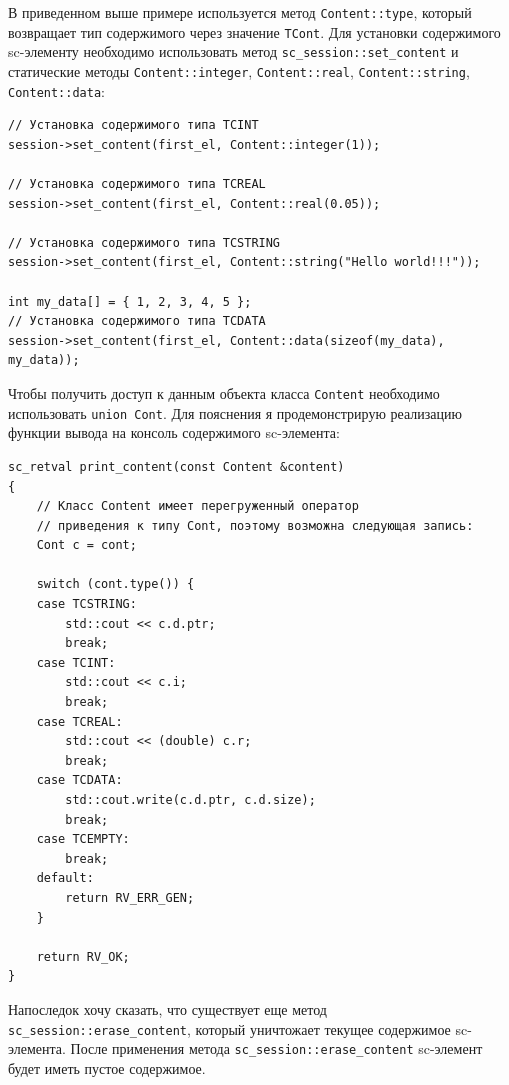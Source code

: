В приведенном выше примере используется метод
\lstinline|Content::type|, который возвращает тип содержимого через
значение \lstinline|TCont|. Для установки содержимого sc-элементу
необходимо использовать метод \lstinline|sc_session::set_content| и
статические методы \lstinline|Content::integer|,
\lstinline|Content::real|, \lstinline|Content::string|,
\lstinline|Content::data|:
\begin{lstlisting}[texcl]
// Установка содержимого типа TCINT
session->set_content(first_el, Content::integer(1));

// Установка содержимого типа TCREAL
session->set_content(first_el, Content::real(0.05));

// Установка содержимого типа TCSTRING
session->set_content(first_el, Content::string("Hello world!!!"));

int my_data[] = { 1, 2, 3, 4, 5 };
// Установка содержимого типа TCDATA
session->set_content(first_el, Content::data(sizeof(my_data), my_data));
\end{lstlisting}

Чтобы получить доступ к данным объекта класса \lstinline|Content|
необходимо использовать \lstinline|union Cont|. Для пояснения я
продемонстрирую реализацию функции вывода на консоль содержимого
sc-элемента:
\begin{lstlisting}[texcl]
sc_retval print_content(const Content &content)
{
    // Класс Content имеет перегруженный оператор
    // приведения к типу Cont, поэтому возможна следующая запись:
    Cont c = cont;

    switch (cont.type()) {
    case TCSTRING:
        std::cout << c.d.ptr;
        break;
    case TCINT:
        std::cout << c.i;
        break;
    case TCREAL:
        std::cout << (double) c.r;
        break;
    case TCDATA:
        std::cout.write(c.d.ptr, c.d.size);
        break;
    case TCEMPTY:
        break;
    default:
        return RV_ERR_GEN;
    }

    return RV_OK;
}
\end{lstlisting}

Напоследок хочу сказать, что существует еще метод
\lstinline|sc_session::erase_content|, который уничтожает текущее
содержимое sc-элемента. После применения метода
\lstinline|sc_session::erase_content| sc-элемент будет иметь пустое
содержимое.

